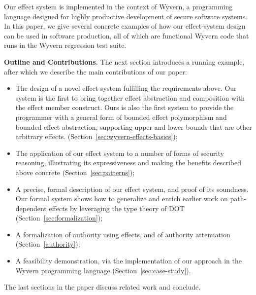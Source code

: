 Our effect system is implemented in the context of Wyvern, a programming language designed for highly productive development of secure software systems.  In this paper, we give several concrete examples of how our effect-system design can be used in software production, all of which are functional Wyvern code that runs in the Wyvern regression test suite.

\noindent\textbf{Outline and Contributions.}  The next section introduces a running example, after which we describe the main contributions of our paper:
\begin{itemize}
\item The design of a novel effect system fulfilling the requirements above. Our system is the first to bring together effect abstraction and composition with the effect member construct.  Ours is also the first system to provide the programmer with a general form of bounded effect polymorphism and bounded effect abstraction, supporting upper and lower bounds that are other arbitrary effects.  (Section~\ref{sec:wyvern-effects-basics});
\item The application of our effect system to a number of forms of security reasoning, illustrating its expressiveness and making the benefits described above concrete (Section~\ref{sec:patterns}); 
\item A precise, formal description of our effect system, and proof of its soundness.  Our formal system shows how to generalize and enrich earlier work on path-dependent effects by leveraging the type theory of DOT (Section~\ref{sec:formalization});
\item A formalization of authority using effects, and of authority attenuation (Section~\ref{authority});
\item A feasibility demonstration, via the implementation of our approach in the Wyvern programming language (Section~\ref{sec:case-study}).
\end{itemize}
The last sections in the paper discuss related work and conclude.
